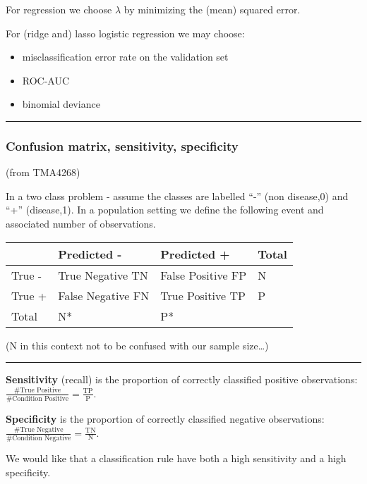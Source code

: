 \documentclass[
]{article}
\providecommand{\tightlist}{%
  \setlength{\itemsep}{0pt}\setlength{\parskip}{0pt}}
\begin{document}
For regression we choose \(\lambda\) by minimizing the (mean) squared
error.

For (ridge and) lasso logistic regression we may choose:

\begin{itemize}
\tightlist
\item
  misclassification error rate on the validation set
\item
  ROC-AUC
\item
  binomial deviance
\end{itemize}

\begin{center}\rule{0.5\linewidth}{0.5pt}\end{center}

\hypertarget{confusion-matrix-sensitivity-specificity}{%
\subsubsection{Confusion matrix, sensitivity,
specificity}\label{confusion-matrix-sensitivity-specificity}}

(from TMA4268)

In a two class problem - assume the classes are labelled ``-'' (non
disease,0) and ``+'' (disease,1). In a population setting we define the
following event and associated number of observations.

\begin{longtable}[]{@{}llll@{}}
\toprule
& Predicted - & Predicted + & Total\tabularnewline
\midrule
\endhead
True - & True Negative TN & False Positive FP & N\tabularnewline
True + & False Negative FN & True Positive TP & P\tabularnewline
Total & N* & P* &\tabularnewline
\bottomrule
\end{longtable}

(N in this context not to be confused with our sample size\ldots)

\begin{center}\rule{0.5\linewidth}{0.5pt}\end{center}

\textbf{Sensitivity} (recall) is the proportion of correctly classified
positive observations:
\(\frac{\# \text{True Positive}}{\# \text{Condition Positive}}=\frac{\text{TP}}{\text{P}}\).

\textbf{Specificity} is the proportion of correctly classified negative
observations:
\(\frac{\# \text{True Negative}}{\# \text{Condition Negative}}=\frac{\text{TN}}{\text{N}}\).

We would like that a classification rule have both a high sensitivity
and a high specificity.
\end{document}
